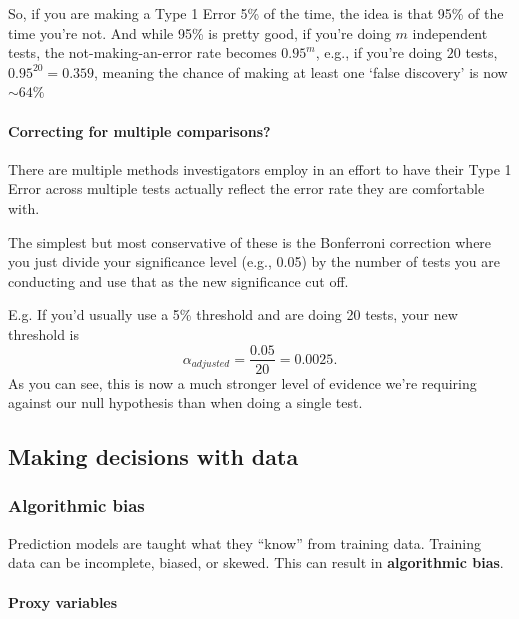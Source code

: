 \documentclass[
  openany]{book}
\begin{document}
So, if you are making a Type 1 Error 5\% of the time, the idea is that 95\% of the time you're not. And while 95\% is pretty good, if you're doing \(m\) independent tests, the not-making-an-error rate becomes \(0.95^m\), e.g., if you're doing \(20\) tests, \(0.95^{20}=0.359\), meaning the chance of making at least one `false discovery' is now \(\sim64\%\)

\hypertarget{correcting-for-multiple-comparisons}{%
\paragraph{Correcting for multiple comparisons?}\label{correcting-for-multiple-comparisons}}

There are multiple methods investigators employ in an effort to have their Type 1 Error across multiple tests actually reflect the error rate they are comfortable with.

The simplest but most conservative of these is the Bonferroni correction where you just divide your significance level (e.g., 0.05) by the number of tests you are conducting and use that as the new significance cut off.

E.g. If you'd usually use a 5\% threshold and are doing 20 tests, your new threshold is \[\alpha_{adjusted} = \frac{0.05}{20} = 0.0025.\]
As you can see, this is now a much stronger level of evidence we're requiring against our null hypothesis than when doing a single test.

\hypertarget{making-decisions-with-data}{%
\subsection{Making decisions with data}\label{making-decisions-with-data}}

\hypertarget{algorithmic-bias}{%
\subsubsection{Algorithmic bias}\label{algorithmic-bias}}

Prediction models are taught what they ``know'' from training data. Training data can be incomplete, biased, or skewed. This can result in
\textbf{algorithmic bias}.

\hypertarget{proxy-variables}{%
\paragraph{Proxy variables}\label{proxy-variables}}
\end{document}
